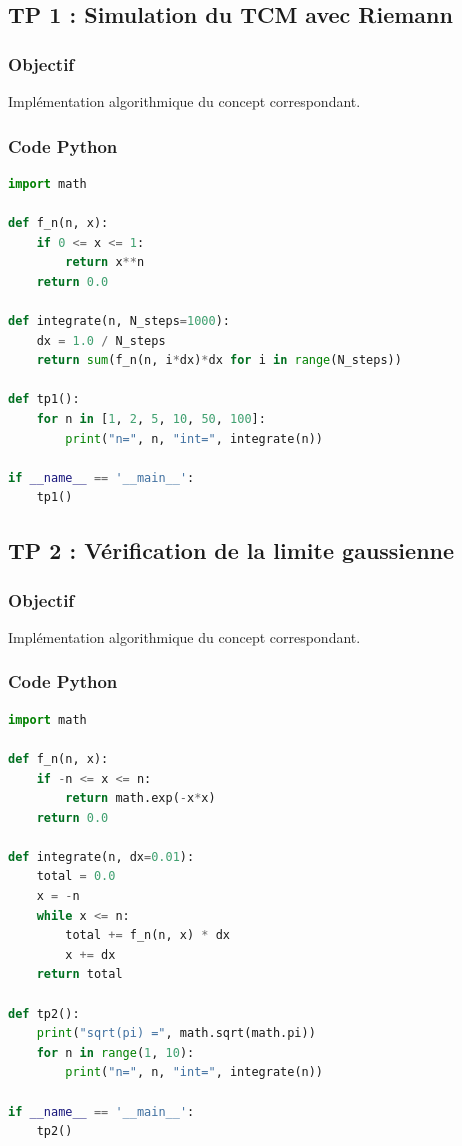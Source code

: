 \documentclass[11pt,a4paper]{article}
\begin{document}
\subsection*{TP 1 : Simulation du TCM avec Riemann}

\subsubsection*{Objectif}
Implémentation algorithmique du concept correspondant.

\subsubsection*{Code Python}
\begin{lstlisting}[language=python]
import math

def f_n(n, x):
    if 0 <= x <= 1:
        return x**n
    return 0.0

def integrate(n, N_steps=1000):
    dx = 1.0 / N_steps
    return sum(f_n(n, i*dx)*dx for i in range(N_steps))

def tp1():
    for n in [1, 2, 5, 10, 50, 100]:
        print("n=", n, "int=", integrate(n))

if __name__ == '__main__':
    tp1()
\end{lstlisting}


\subsection*{TP 2 : Vérification de la limite gaussienne}

\subsubsection*{Objectif}
Implémentation algorithmique du concept correspondant.

\subsubsection*{Code Python}
\begin{lstlisting}[language=python]
import math

def f_n(n, x):
    if -n <= x <= n:
        return math.exp(-x*x)
    return 0.0

def integrate(n, dx=0.01):
    total = 0.0
    x = -n
    while x <= n:
        total += f_n(n, x) * dx
        x += dx
    return total

def tp2():
    print("sqrt(pi) =", math.sqrt(math.pi))
    for n in range(1, 10):
        print("n=", n, "int=", integrate(n))

if __name__ == '__main__':
    tp2()
\end{lstlisting}
\end{document}
